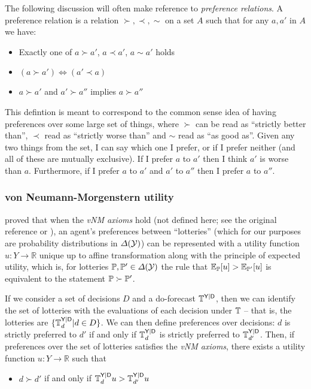 The following discussion will often make reference to \emph{preference relations}. A preference relation is a relation $\succ,\prec,\sim$ on a set $A$ such that for any $a,a'$ in $A$ we have:
\begin{itemize}
    \item Exactly one of $a\succ a'$, $a\prec a'$, $a\sim a'$ holds
    \item $(a\succ a')\iff(a'\prec a)$
    \item $a\succ a'$ and $a'\succ a''$ implies $a\succ a''$
\end{itemize}

This defintion is meant to correspond to the common sense idea of having preferences over some large set of things, where $\succ$ can be read as ``strictly better than'', $\prec$ read as ``strictly worse than'' and $\sim$ read as ``as good as''. Given any two things from the set, I can say which one I prefer, or if I prefer neither (and all of these are mutually exclusive). If I prefer $a$ to $a'$ then I think $a'$ is worse than $a$. Furthermore, if I prefer $a$ to $a'$ and $a'$ to $a''$ then I prefer $a$ to $a''$.

\subsubsection{von Neumann-Morgenstern utility}

\citet{von_neumann_theory_1944} proved that when the \emph{vNM axioms} hold (not defined here; see the original reference or \citet{steele_decision_2020}), an agent's preferences between ``lotteries'' (which for our purposes are probability distributions in $\Delta(\mathcal{Y})$) can be represented with a utility function $u:Y\to \mathbb{R}$ unique up to affine transformation along with the principle of expected utility, which is, for lotteries $\mathbb{P},\mathbb{P}'\in\Delta(\mathcal{Y})$ the rule that $\mathbb{E}_{\mathbb{P}}[u]> \mathbb{E}_{\mathbb{P}'}[u]$ is equivalent to the statement $\mathbb{P} \succ \mathbb{P}'$.

If we consider a set of decisions $D$ and a do-forecast $\mathbb{T}^{\mathsf{Y}|\mathsf{{D}}}$, then we can identify the set of lotteries with the evaluations of each decision under $\mathbb{T}$ -- that is, the lotteries are $\{\mathbb{T}^{\mathsf{Y}|\mathsf{D}}_d|d\in D\}$. We can then define preferences over decisions: $d$ is strictly preferred to $d'$ if and only if $\mathbb{T}_{d}^{\mathsf{Y}|\mathsf{D}}$ is strictly preferred to $\mathbb{T}_{d'}^{\mathsf{Y}|\mathsf{D}}$. Then, if preferences over the set of lotteries satisfies the \emph{vNM axioms}, there exists a utility function $u:Y\to \mathbb{R}$ such that
\begin{itemize}
    \item $d\succ d'$ if and only if $\mathbb{T}_d^{\mathsf{Y}|\mathsf{D}}u>\mathbb{T}_{d'}^{\mathsf{Y}|\mathsf{D}}u$
\end{itemize}


